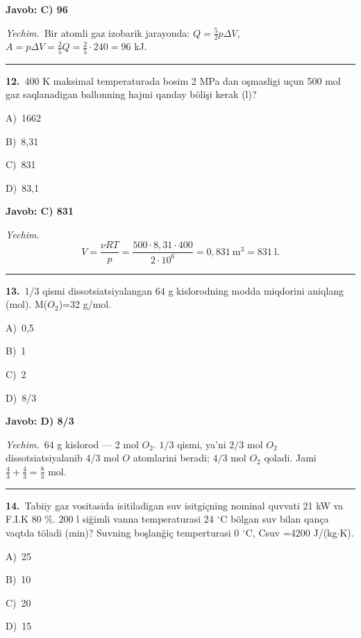 \documentclass[11pt,a4paper]{article}
\newcommand{\opt}[2]{\hspace*{4mm}#1)\ #2\par}
\begin{document}
\noindent\colorbox{gray!12}{\parbox{\dimexpr\linewidth-2\fboxsep}{\textbf{Javob: C) 96}}}\par\smallskip
\noindent\textit{Yechim.}\ Bir atomli gaz izobarik jarayonda: $Q=\frac52p\Delta V$, $A=p\Delta V=\frac25Q=\frac25\cdot240=96$ kJ.\par\par\medskip\hrule\medskip
{}\noindent\begin{minipage}{\linewidth}
\textbf{12.}\ 400 K maksimal temperaturada bosim 2 MPa dan oşmasligi uçun 500 mol gaz saqlanadigan ballonning hajmi qanday bölişi kerak (l)?\par\smallskip
\opt{A}{1662}
\opt{B}{8,31}
\opt{C}{831}
\opt{D}{83,1}
\end{minipage}\vspace{2pt}\par
\noindent\colorbox{gray!12}{\parbox{\dimexpr\linewidth-2\fboxsep}{\textbf{Javob: C) 831}}}\par\smallskip
\noindent\textit{Yechim.}\ \[V=\frac{\nu RT}{p}=\frac{500\cdot8{,}31\cdot400}{2\cdot10^6}=0{,}831\ \text{m}^3=831\ \text{l}.\]\par\medskip\hrule\medskip
{}\noindent\begin{minipage}{\linewidth}
\textbf{13.}\ 1/3 qismi dissotsiatsiyalangan 64 g kislorodning modda miqdorini aniqlang (mol). M($O_2$)=32 g/mol.\par\smallskip
\opt{A}{0,5}
\opt{B}{1}
\opt{C}{2}
\opt{D}{8/3}
\end{minipage}\vspace{2pt}\par
\noindent\colorbox{gray!12}{\parbox{\dimexpr\linewidth-2\fboxsep}{\textbf{Javob: D) 8/3}}}\par\smallskip
\noindent\textit{Yechim.}\ 64 g kislorod — 2 mol $O_2$. $1/3$ qismi, ya’ni $2/3$ mol $O_2$ dissotsiatsiyalanib $4/3$ mol $O$ atomlarini beradi; $4/3$ mol $O_2$ qoladi. Jami $\frac43+\frac43=\frac83$ mol.\par\par\medskip\hrule\medskip
{}\noindent\begin{minipage}{\linewidth}
\textbf{14.}\ Tabiiy gaz vositasida isitiladigan suv isitgiçning nominal quvvati 21 kW va F.I.K 80 \%. 200 l siğimli vanna temperaturasi 24 $^\circ$C bölgan suv bilan qança vaqtda töladi (min)? Suvning boşlanğiç temperturasi 0 $^\circ$C, Csuv =4200 J/(kg$\cdot$K).\par\smallskip
\opt{A}{25}
\opt{B}{10}
\opt{C}{20}
\opt{D}{15}
\end{minipage}\vspace{2pt}\par
\end{document}
